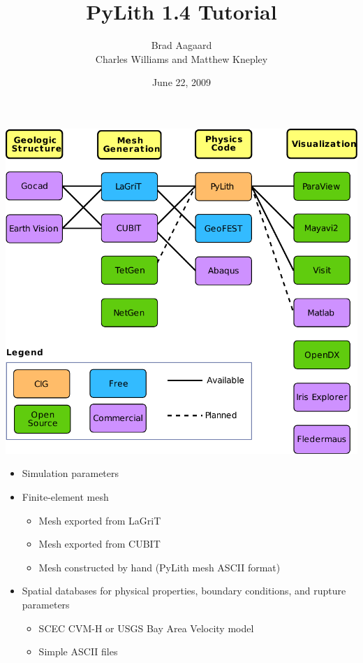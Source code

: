 \documentclass[pdftex,cig,slideColor]{pp4slides}
\title{PyLith 1.4 Tutorial}
\subtitle{}
\author{Brad Aagaard\\[10pt]
  Charles Williams and Matthew Knepley}
\date{June 22, 2009}
\begin{document}


  \vfill
  \begin{center}
    \includegraphics[scale=1.15]{figs/workflow}
  \end{center}
  \vfill


  \begin{itemize}
  \item Simulation parameters
  \item Finite-element mesh
    \begin{itemize}
    \item Mesh exported from LaGriT
    \item Mesh exported from CUBIT
    \item Mesh constructed by hand (PyLith mesh ASCII format)
    \end{itemize}
  \item Spatial databases for physical properties, boundary
    conditions, and rupture parameters
    \begin{itemize}
    \item SCEC CVM-H or USGS Bay Area Velocity model
    \item Simple ASCII files
    \end{itemize}
  \end{itemize}
\end{document}
